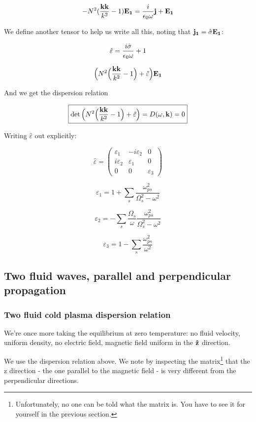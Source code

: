 \documentclass[PlasmaNotes.tex]{subfiles}
\begin{document}
\[ - N^2 (\frac{\mathbf{k}\mathbf{k}}{k^2} - 1) \mathbf{E_1} = \frac{i}{\epsilon_0 \omega} \mathbf{j} + \mathbf{E_1} \]

We define another tensor to help us write all this, noting that $\mathbf{j_1} = \hat{\sigma} \mathbf{E_1}$:

\[ \hat{\varepsilon} = \frac{i \hat{\sigma}}{\epsilon_0 \omega} +1 \]

\[ \Big(N^2 \Big(\frac{\mathbf{k}\mathbf{k}}{k^2} -1\Big) + \hat{\varepsilon}\Big) \mathbf{E_1} \] 

And we get the dispersion relation

\begin{equation}
\boxed{\det{\Big(N^2 \Big(\frac{\ensuremath{\mathbf{k}}\ensuremath{\mathbf{k}}}{k^2} -1\Big) + \hat{\varepsilon}\Big)} = D(\omega, \mathbf{k}) = 0}
\end{equation}

Writing $\hat{\varepsilon}$ out explicitly:

\[ \hat{\varepsilon} = \begin{pmatrix}
\varepsilon_1 & -i\varepsilon_2 & 0 \\
i\varepsilon_2 & \varepsilon_1 & 0 \\
0 & 0 & \varepsilon_3
\end{pmatrix} \]

\[ \varepsilon_1 = 1 + \sum_s{\frac{\omega_{ps}^2}{\Omega_s^2 - \omega^2}} \]

\[ \varepsilon_2 = - \sum_s{\frac{\Omega_s}{\omega} \frac{\omega_{ps}^2}{\Omega_s^2-\omega^2}} \]

\[ \varepsilon_3 = 1-\sum_s{\frac{\omega_{ps}^2}{\omega^2}} \]




\subsection{Two fluid waves, parallel and perpendicular propagation}

\subsubsection{Two fluid cold plasma dispersion relation}

We're once more taking the equilibrium at zero temperature: no fluid velocity, uniform density, no electric field, magnetic field uniform in the $\mathbf{\hat{z}}$ direction. 

We use the dispersion relation above. We note by inspecting the matrix\footnote{Unfortunately, no one can be told what the matrix is. You have to see it for yourself in the previous section.} that the z direction - the one parallel to the magnetic field - is very different from the perpendicular directions.
\end{document}
